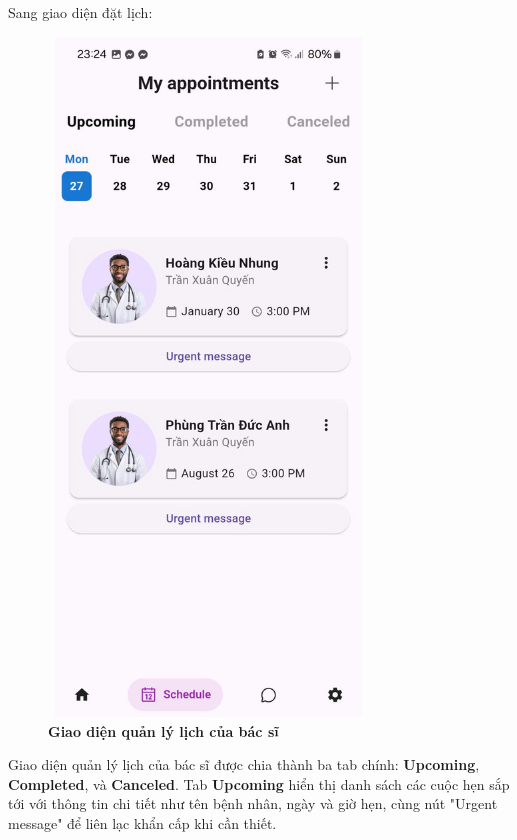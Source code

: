 Sang giao diện đặt lịch:
\begin{figure}[H]
	\centering
	\includegraphics[width=8.5cm,height=18cm]{Images/AppUI/scheduleUpComing.jpg}
	\caption[Giao diện quản lý lịch của bác sĩ]{\bfseries \fontsize{12pt}{0pt}\selectfont Giao diện quản lý lịch của bác sĩ}
	\label{scheduleDoctor}
\end{figure}
Giao diện quản lý lịch của bác sĩ được chia thành ba tab chính: \textbf{Upcoming}, \textbf{Completed}, và \textbf{Canceled}. Tab \textbf{Upcoming} hiển thị danh sách các cuộc hẹn sắp tới với thông tin chi tiết như tên bệnh nhân, ngày và giờ hẹn, cùng nút "Urgent message" để liên lạc khẩn cấp khi cần thiết. 


